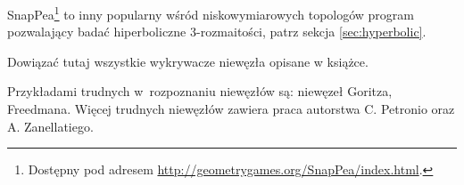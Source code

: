 SnapPea\footnote{Dostępny pod adresem \url{http://geometrygames.org/SnapPea/index.html}.} to inny popularny wśród niskowymiarowych topologów program pozwalający badać hiperboliczne 3-rozmaitości, patrz sekcja \ref{sec:hyperbolic}.

\begin{tobedone}
    Dowiązać tutaj wszystkie wykrywacze niewęzła opisane w książce.
\end{tobedone}

Przykładami trudnych w~rozpoznaniu niewęzłów są: niewęzeł Goritza, Freedmana.
Więcej trudnych niewęzłów zawiera praca \cite{zanellati16} autorstwa C. Petronio oraz A. Zanellatiego.

